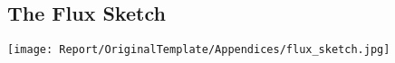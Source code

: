 \begin{appendices}


\section{The Flux Sketch}
\texttt{[image: Report/OriginalTemplate/Appendices/flux\_sketch.jpg]}
\label{appx: Flux Sketch}



\end{appendices}
